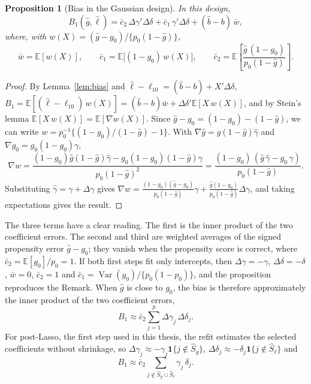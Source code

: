 \documentclass[11pt]{article}
\providecommand{\E}{\mathbb{E}}
\newenvironment{ins}{\begin{leftbar}}{\end{leftbar}}
\theoremstyle{plain}
\newtheorem{proposition}[lemma]{Proposition}
\theoremstyle{remark}
\begin{document}
\begin{ins}
\begin{proposition}[Bias in the Gaussian design] %
In this design,
\[
  B_1(\hat g,\hat\ell)=\bar c_2\,\Delta\gamma'\Delta\delta+\bar c_1\,\gamma'\Delta\delta+(\hat b-b)\,\bar w ,
\]
where, with $w(X)=(\hat g-g_0)/\{p_0(1-\hat g)\}$,
\[
  \bar w=\E[w(X)],\qquad
  \bar c_1=\E\big[(1-g_0)\,w(X)\big],\qquad
  \bar c_2=\E\left[\frac{\hat g\,(1-g_0)}{p_0(1-\hat g)}\right].
\]
\end{proposition}
\begin{proof}
By Lemma~\ref{lem:bias} and $\hat\ell-\ell_{10}=(\hat b-b)+X'\Delta\delta$,
$B_1=\E[(\hat\ell-\ell_{10})\,w(X)]=(\hat b-b)\bar w+\Delta\delta'\E[X\,w(X)]$, and
by Stein's lemma $\E[X\,w(X)]=\E[\nabla w(X)]$. Since
$\hat g-g_0=(1-g_0)-(1-\hat g)$, we can write
$w=p_0^{-1}\{(1-g_0)/(1-\hat g)-1\}$. With
$\nabla\hat g=\hat g(1-\hat g)\hat\gamma$ and $\nabla g_0=g_0(1-g_0)\gamma$,
\[
  \nabla w=\frac{(1-g_0)\hat g(1-\hat g)\hat\gamma-g_0(1-g_0)(1-\hat g)\gamma}{p_0(1-\hat g)^2}
  =\frac{(1-g_0)\,(\hat g\,\hat\gamma-g_0\,\gamma)}{p_0(1-\hat g)} .
\]
Substituting $\hat\gamma=\gamma+\Delta\gamma$ gives
$\nabla w=\frac{(1-g_0)(\hat g-g_0)}{p_0(1-\hat g)}\gamma+\frac{\hat g(1-g_0)}{p_0(1-\hat g)}\Delta\gamma$,
and taking expectations gives the result.
\end{proof}
The three terms have a clear reading. The first is the inner product of the two
coefficient errors. The second and third are weighted averages of the signed
propensity error $\hat g-g_0$; they vanish when the propensity score is correct,
where $\bar c_2=\E[g_0]/p_0=1$. If both first steps fit only intercepts, then
$\Delta\gamma=-\gamma$, $\Delta\delta=-\delta$, $\bar w=0$, $\bar c_2=1$ and
$\bar c_1=\operatorname{Var}(g_0)/\{p_0(1-p_0)\}$, and the proposition
reproduces the Remark. When $\hat g$ is close to $g_0$, the bias is therefore
approximately the inner product of the two coefficient errors,
\begin{equation}\label{eq:inner}
  B_1\approx\bar c_2\sum_{j=1}^p\Delta\gamma_j\,\Delta\delta_j .
\end{equation}
For post-Lasso, the first step used in this thesis, the refit estimates the
selected coefficients without shrinkage, so
$\Delta\gamma_j\approx-\gamma_j\mathbf 1\{j\notin\hat S_g\}$,
$\Delta\delta_j\approx-\delta_j\mathbf 1\{j\notin\hat S_\ell\}$ and
\begin{equation}\label{eq:both}
  B_1\approx\bar c_2\sum_{j\notin\hat S_g\cup\hat S_\ell}\gamma_j\,\delta_j .

\end{equation}
\end{ins}
\end{document}
